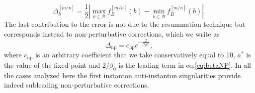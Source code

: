 \documentclass [11pt]{article}
\begin{document}
\begin{equation}
\Delta^{[m/n]}_b=\frac{1}{2}\left| \max_{b\in\mathcal{B}}f_B^{[m/n]}(b)-\min_{b\in\mathcal{B}}f_B^{[m/n]}(b)\right|.
\label{eqn:a8}
\end{equation}
The last contribution to the error is not due to the resummation technique but corresponds instead to non-perturbative corrections, which we write as 
\begin{equation}
\Delta_{\mathrm{np}}=c_{\mathrm{np}}e^{-\frac{2}{\beta_0 a^*}},
\label{eqn:51}
\end{equation}
where $c_\mathrm{np}$ is an arbitrary coefficient that we take conservatively equal to 10, $a^*$ is the value of the fixed point and  $2/\beta_0$ is the leading term in eq.\eqref{eq:betaNP}. In all the cases analyzed here the first instanton anti-instanton singularities provide indeed subleading non-perturbative corrections.




\end{document}
